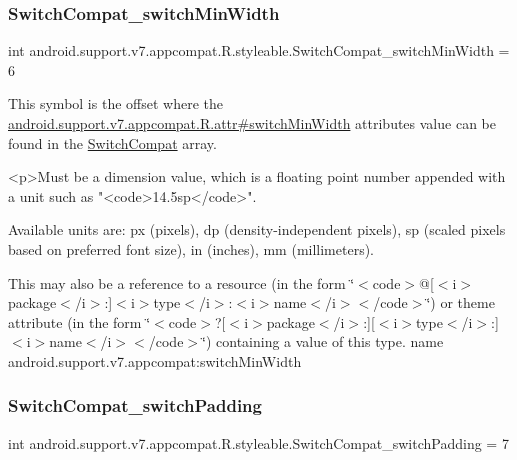 \subsubsection{\texorpdfstring{Switch\+Compat\+\_\+switch\+Min\+Width}{SwitchCompat\_switchMinWidth}}
{\footnotesize\ttfamily int android.\+support.\+v7.\+appcompat.\+R.\+styleable.\+Switch\+Compat\+\_\+switch\+Min\+Width = 6\hspace{0.3cm}{\ttfamily [static]}}

This symbol is the offset where the \hyperlink{classandroid_1_1support_1_1v7_1_1appcompat_1_1R_1_1attr_aafe6db8b889a67906f7cccf72cb3bca4}{android.\+support.\+v7.\+appcompat.\+R.\+attr\#switch\+Min\+Width} attribute\textquotesingle{}s value can be found in the \hyperlink{classandroid_1_1support_1_1v7_1_1appcompat_1_1R_1_1styleable_aabe688560752254f2288f3eaf9439737}{Switch\+Compat} array.

\begin{DoxyVerb}      <p>Must be a dimension value, which is a floating point number appended with a unit such as "<code>14.5sp</code>".
\end{DoxyVerb}
 Available units are\+: px (pixels), dp (density-\/independent pixels), sp (scaled pixels based on preferred font size), in (inches), mm (millimeters). 

This may also be a reference to a resource (in the form \char`\"{}$<$code$>$@\mbox{[}$<$i$>$package$<$/i$>$\+:\mbox{]}$<$i$>$type$<$/i$>$\+:$<$i$>$name$<$/i$>$$<$/code$>$\char`\"{}) or theme attribute (in the form \char`\"{}$<$code$>$?\mbox{[}$<$i$>$package$<$/i$>$\+:\mbox{]}\mbox{[}$<$i$>$type$<$/i$>$\+:\mbox{]}$<$i$>$name$<$/i$>$$<$/code$>$\char`\"{}) containing a value of this type.  name android.\+support.\+v7.\+appcompat\+:switch\+Min\+Width \mbox{\label{classandroid_1_1support_1_1v7_1_1appcompat_1_1R_1_1styleable_a1e99c3ed5f4af85046d43bd8e1f6f61e}} 
\subsubsection{\texorpdfstring{Switch\+Compat\+\_\+switch\+Padding}{SwitchCompat\_switchPadding}}
{\footnotesize\ttfamily int android.\+support.\+v7.\+appcompat.\+R.\+styleable.\+Switch\+Compat\+\_\+switch\+Padding = 7\hspace{0.3cm}{\ttfamily [static]}}

